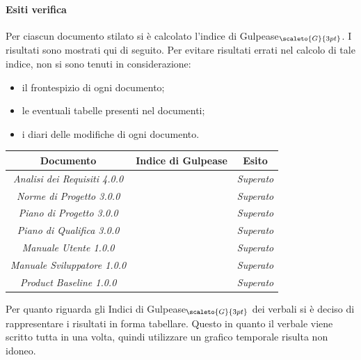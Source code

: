 {{{{{{{{\paragraph{Esiti verifica}\label{ResocontoAttivitàDiVerificaRevisioneDiQualificaVerificheDiProdottoStrategiaAdoperataPerLAnalisiStaticaDeiDocumentiEsitiDiVerifica}
Per ciascun documento stilato si è calcolato l’indice di Gulpease$_{\scaleto{G}{3pt}}$. I risultati sono mostrati qui di seguito.
Per evitare risultati errati nel calcolo di tale indice, non si sono tenuti in considerazione:
\begin{itemize}
	\item il frontespizio di ogni documento;
	\item le eventuali tabelle presenti nel documenti;
	\item i diari delle modifiche di ogni documento.
\end{itemize}
\quad
\def\tabularxcolumn#1{m{#1}}
{
	\begin{center}
		\renewcommand{\arraystretch}{1.4}
		\begin{tabularx}{11,70cm}{|c|c|c|}
			\hline
			\rowcolor{airforceblue}
			\textbf{Documento} & \textbf{Indice di Gulpease} & \textbf{Esito}\\
			\hline
			\textit{Analisi dei Requisiti 4.0.0} &  & \textit{Superato}\\
			\hline
			\textit{Norme di Progetto 3.0.0} & & \textit{Superato}\\
			\hline
			\textit{Piano di Progetto 3.0.0} &  & \textit{Superato}\\
			\hline
			\textit{Piano di Qualifica 3.0.0} &  & \textit{Superato}\\
			\hline
			\textit{Manuale Utente 1.0.0} & & \textit{Superato}\\
			\hline
			\textit{Manuale Sviluppatore 1.0.0} & & \textit{Superato}\\
			\hline
			\textit{Product Baseline 1.0.0} & & \textit{Superato}\\
			\hline
		\end{tabularx}
	\end{center}

Per quanto riguarda gli Indici di Gulpease$_{\scaleto{G}{3pt}}$ dei verbali si è deciso di rappresentare i risultati in forma tabellare.
Questo in quanto il verbale viene scritto tutta in una volta, quindi utilizzare un grafico temporale risulta non idoneo.

}}}}}}}}}
